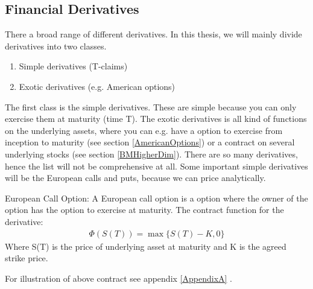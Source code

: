 \subsection{Financial Derivatives}
There a broad range of different derivatives. In this thesis, we will mainly divide derivatives into two classes. 
\begin{enumerate}
\item Simple derivatives (T-claims)
\item Exotic derivatives (e.g. American options)
\end{enumerate}
The first class is the simple derivatives. These are simple because you can only exercise them at maturity (time T). The exotic derivatives is all kind of functions on the underlying assets, where you can e.g. have a option to exercise from inception to maturity (see section \ref{AmericanOptions}) or a contract on several underlying stocks (see section \ref{BMHigherDim}). There are so many derivatives, hence the list will not be comprehensive at all. Some important simple derivatives will be the European calls and puts, because we can price analytically.

\theoremstyle{definition}
\begin{definition}{European Call Option:}\label{ECall}
A European call option is a option where the owner of the option has the option to exercise at maturity. The contract function for the derivative:
\begin{equation}
\begin{split}
\Phi(S(T))=\max\{S(T)-K, 0\}
\end{split}
\end{equation}
Where S(T) is the price of underlying asset at maturity and K is the agreed strike price.
\end{definition}
For illustration of above contract see appendix \ref{AppendixA} \parencite{finKont}.




